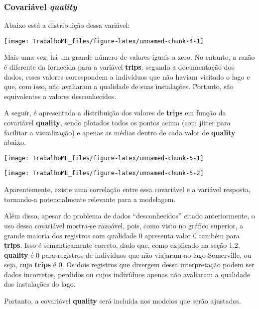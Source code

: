 \documentclass[
  twocolumn]{article}
\begin{document}
\subsubsection{\texorpdfstring{Covariável
\emph{quality}}{Covariável quality}}\label{covariuxe1vel-quality}

Abaixo está a distribuição dessa variável:

\begin{center}\texttt{[image: TrabalhoME\_files/figure-latex/unnamed-chunk-4-1]} \end{center}

Mais uma vez, há um grande número de valores iguais a zero. No entanto,
a razão é diferente da fornecida para a variável \textbf{trips}: segundo
a documentação dos dados, esses valores correspondem a indivíduos que
não haviam visitado o lago e que, com isso, não avaliaram a qualidade de
suas instalações. Portanto, são equivalentes a valores desconhecidos.

A seguir, é apresentada a distribuição dos valores de \textbf{trips} em
função da covariável \textbf{quality}, sendo plotados todos os pontos
acima (com jitter para facilitar a visualização) e apenas as médias
dentro de cada valor de \textbf{quality} abaixo.

\begin{center}\texttt{[image: TrabalhoME\_files/figure-latex/unnamed-chunk-5-1]} \end{center}

\begin{center}\texttt{[image: TrabalhoME\_files/figure-latex/unnamed-chunk-5-2]} \end{center}

Aparentemente, existe uma correlação entre essa covariável e a variável
resposta, tornando-a potencialmente relevante para a modelagem.

Além disso, apesar do problema de dados ``desconhecidos'' citado
anteriormente, o uso dessa covariável mostra-se razoável, pois, como
visto no gráfico superior, a grande maioria dos registros com qualidade
\(0\) apresenta valor \(0\) também para \textbf{trips}. Isso é
semanticamente correto, dado que, como explicado na seção 1.2,
\textbf{quality} é \(0\) para registros de indivíduos que não viajaram
ao lago Somerville, ou seja, cujo \textbf{trips} é \(0\). Os dois
registros que divergem dessa interpretação podem ser dados incorretos,
perdidos ou cujos indivíduos apenas não avaliaram a qualidade das
instalações do lago.

Portanto, a covariável \textbf{quality} será incluída nos modelos que
serão ajustados.
\end{document}
